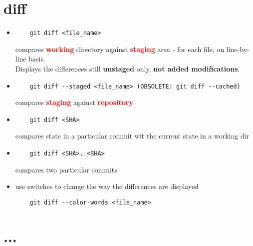 \documentclass{report}
\begin{document}
\chapter{diff}
\begin{itemize}
	\item \begin{verbatim}
	git diff <file_name>
	\end{verbatim}
	compares \textcolor{red}{\textbf{working}} directory against \textcolor{red}{\textbf{staging}} area - for each file, on line-by-line basis.\\
	Displays the differences still \textbf{unstaged} only, \textbf{not added modifications}.
	
	\item \begin{verbatim}
	git diff --staged <file_name> (OBSOLETE: git diff --cached)
	\end{verbatim}
	compares \textcolor{red}{\textbf{staging}} against \textcolor{red}{\textbf{repository}}
	
	\item \begin{verbatim}
	git diff <SHA>
	\end{verbatim}
	compares state in a particular commit wit the current state in a working dir
	
	\item \begin{verbatim}
	git diff <SHA>..<SHA>\end{verbatim}
	compares two particular commits
	
	\item use switches to change the way the differences are displayed
	\begin{lstlisting}
	git diff --color-words <file_name>
	\end{lstlisting}
\end{itemize}



\chapter{...}
\end{document}
